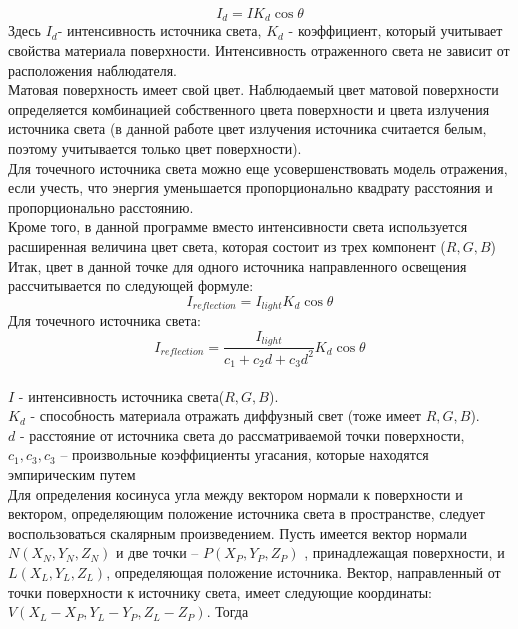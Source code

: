 \documentclass[a4paper, 10pt]{article}
\begin{document}
	\begin{equation}
		I_d = IK_d\cos\theta
	\end{equation}
	Здесь $I_d$- интенсивность источника света, $K_d$ - коэффициент, который учитывает свойства материала поверхности. Интенсивность отраженного света не зависит от расположения наблюдателя.
	\\ \hspace*{5mm}Матовая поверхность имеет свой цвет. Наблюдаемый цвет матовой поверхности определяется комбинацией собственного цвета поверхности и цвета излучения источника света (в данной работе цвет излучения источника считается белым, поэтому учитывается только цвет поверхности).
	\\ \hspace*{5mm}Для точечного источника света можно еще усовершенствовать модель отражения, если учесть, что энергия уменьшается пропорционально квадрату расстояния и пропорционально расстоянию. 
	\\ \hspace*{5mm}Кроме того, в данной программе вместо интенсивности света используется расширенная величина цвет света, которая состоит из трех компонент ($R, G, B$)	
	\\ \hspace*{5mm}Итак, цвет в данной точке для одного источника направленного освещения рассчитывается по следующей формуле:
	\begin{equation}
		I_{reflection}= I_{light}K_d\cos\theta
	\end{equation}
	Для точечного источника света:
	\begin{equation}
		I_{reflection}= \frac{I_{light}}{c_1 + c_2d + c_3d^2}K_d\cos\theta
	\end{equation}
	\\ $I$ - интенсивность источника света($R, G, B$).
	\\ $K_d$ - способность материала отражать диффузный свет (тоже имеет $R, G, B$).
	\\ $d$ - расстояние от источника света до рассматриваемой точки поверхности, 
	$c_1, c_3, c_3$ – произвольные коэффициенты угасания, которые находятся эмпирическим путем
	\\ Для определения косинуса угла между вектором нормали к поверхности и вектором, определяющим положение источника света в пространстве, следует воспользоваться скалярным произведением. Пусть имеется вектор нормали $N(X_N, Y_N, Z_N)$ и две точки – $P(X_P, Y_P, Z_P)$ , принадлежащая поверхности, и  $L(X_L, Y_L, Z_L)$, определяющая положение источника. Вектор, направленный от точки поверхности к источнику света, имеет следующие координаты:  $V(X_L - X_P, Y_L - Y_P, Z_L - Z_P)$. Тогда
\end{document}

